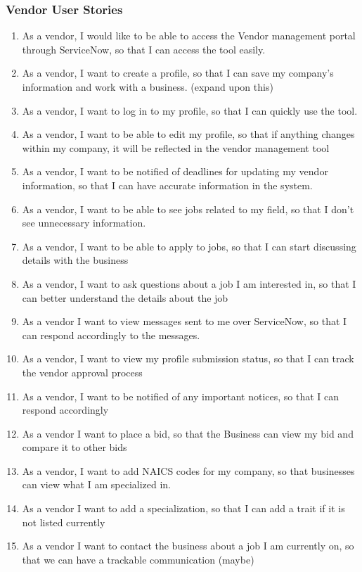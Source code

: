 \documentclass[10pt]{article}
\begin{document}
\subsubsection{Vendor User Stories}

\begin{enumerate}
\item As a vendor, I would like to be able to access the Vendor management portal through ServiceNow, so that I can access the tool easily. 
\item As a vendor, I want to create a profile, so that I can save my company’s information and work with a business. (expand upon this)
\item As a vendor, I want to log in to my profile, so that I can quickly use the tool.
\item As a vendor, I want to be able to edit my profile, so that if anything changes within my company, it will be reflected in the vendor management tool
\item As a vendor, I want to be notified of deadlines for updating my vendor information, so that I can have accurate information in the system.
\item As a vendor, I want to be able to see jobs related to my field, so that I don’t see unnecessary information.
\item As a vendor, I want to be able to apply to jobs, so that I can start discussing details with the business 
\item As a vendor, I want to ask questions about a job I am interested in, so that I can better understand the details about the job
\item As a vendor I want to view messages sent to me over ServiceNow, so that I can respond accordingly to the messages.
\item As a vendor, I want to view my profile submission status, so that I can track the vendor approval process
\item As a vendor, I want to be notified of any important notices, so that I can respond accordingly
\item As a vendor I want to place a bid, so that the Business can view my bid and compare it to other bids
\item As a vendor, I want to add NAICS codes for my company, so that businesses can view what I am specialized in.
\item As a vendor I want to add a specialization, so that I can add a trait if it is not listed currently
\item As a vendor I want to contact the business about a job I am currently on, so that we can have a trackable communication (maybe)

\end{enumerate}
\end{document}
